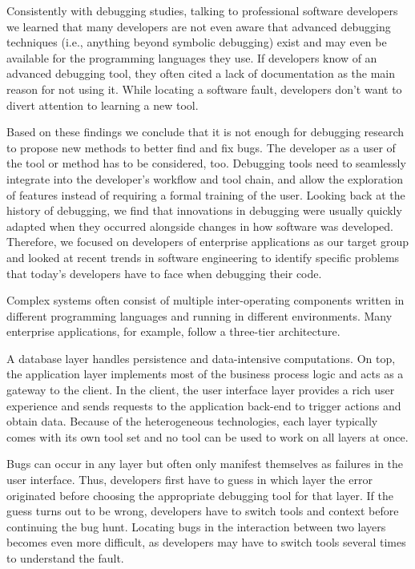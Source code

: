 Consistently with debugging studies, talking to professional software developers we learned that many developers are not even aware that advanced debugging techniques (i.e., anything beyond symbolic debugging) exist and may even be available for the programming languages they use.
If developers know of an advanced debugging tool, they often cited a lack of documentation as the main reason for not using it.
While locating a software fault, developers don't want to divert attention to learning a new tool.

Based on these findings we conclude that it is not enough for debugging research to propose new methods to better find and fix bugs.
The developer as a user of the tool or method has to be considered, too.
Debugging tools need to seamlessly integrate into the developer's workflow and tool chain, and allow the exploration of features instead of requiring a formal training of the user.
Looking back at the history of debugging, we find that innovations in debugging were usually quickly adapted when they occurred alongside changes in how software was developed.
Therefore, we focused on developers of enterprise applications as our target group and looked at recent trends in software engineering to identify specific problems that today's developers have to face when debugging their code. 

Complex systems often consist of multiple inter-operating components written in different programming languages and running in different environments.
Many enterprise applications, for example, follow a three-tier architecture.

A database layer handles persistence and data-intensive computations.
On top, the application layer implements most of the business process logic and acts as a gateway to the client.
In the client, the user interface layer provides a rich user experience and sends requests to the application back-end to trigger actions and obtain data.
Because of the heterogeneous technologies, each layer typically comes with its own tool set and no tool can be used to work on all layers at once.

Bugs can occur in any layer but often only manifest themselves as failures in the user interface.
Thus, developers first have to guess in which layer the error originated before choosing the appropriate debugging tool for that layer.
If the guess turns out to be wrong, developers have to switch tools and context before continuing the bug hunt.
Locating bugs in the interaction between two layers becomes even more difficult, as developers may have to switch tools several times to understand the fault.

